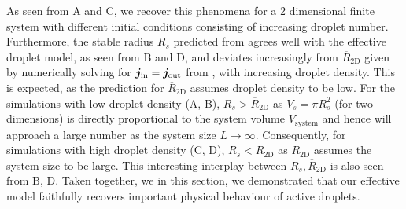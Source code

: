 As seen from A and C, we recover this phenomena for a 2 dimensional finite system with different initial conditions consisting of increasing droplet number.
Furthermore, the stable radius $R_s$ predicted from  agrees well with the effective droplet model, as seen from B and D, and deviates increasingly from $\overline{R}_\mathrm{2D}$ given by numerically solving for $\boldsymbol{j}_\mathrm{in} = \boldsymbol{j}_\mathrm{out}$ from , with increasing droplet density.
This is expected, as the prediction for $\overline{R}_\mathrm{2D}$ assumes droplet density to be low.
For the simulations with low droplet density (A, B), $R_s > \overline{R}_\mathrm{2D}$ as $V_s = \pi R^2_s$ (for two dimensions) is directly proportional to the system volume $V_\mathrm{system}$ and hence will approach a large number as the system size $L \rightarrow \infty$.
Consequently, for simulations with high droplet density (C, D), $R_s < \overline{R}_\mathrm{2D}$ as $\overline{R}_\mathrm{2D}$ assumes the system size to be large. 
This interesting interplay between $R_s, \overline{R}_\mathrm{2D}$ is also seen from B, D.
Taken together, we in this section, we demonstrated that our effective model faithfully recovers important physical behaviour of active droplets.

